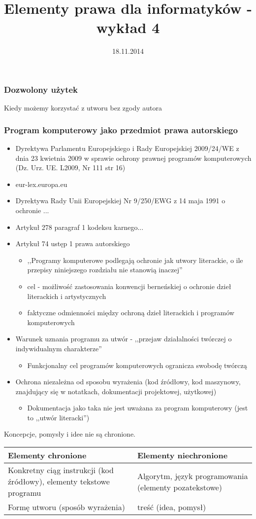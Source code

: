 \documentclass[12pt,a4paper]{article}
\title{Elementy prawa dla informatyków - wykład 4}
\author{}
\date{18.11.2014}
\begin{document}
\maketitle
\subsubsection{Dozwolony użytek}
Kiedy możemy  korzystać z utworu bez zgody autora
\subsubsection{Program komputerowy jako przedmiot prawa autorskiego}
\begin{itemize}
\item Dyrektywa Parlamentu Europejskiego i Rady Europejskiej 2009/24/WE z dnia 23 kwietnia 2009 w sprawie ochrony prawnej programów komputerowych (Dz. Urz. UE. L2009, Nr 111 str 16) 
\item eur-lex.europa.eu
\item Dyrektywa Rady Unii Europejskiej Nr 9/250/EWG z 14 maja 1991 o ochronie ...
\item Artykuł 278 paragraf 1 kodeksu karnego...
\item Artykuł 74 ustęp 1 prawa autorskiego
\begin{itemize}
	\item ,,Programy komputerowe podlegają ochronie jak utwory literackie, o ile przepisy niniejszego rozdziału nie stanowią inaczej''
	\item cel - możliwość zastosowania konwencji berneńskiej o ochronie dzieł literackich i artystycznych
	\item faktyczne odmienności między ochroną dzieł literackich i programów komputerowych
\end{itemize}
\item Warunek uznania programu za utwór - ,,przejaw działalności twórczej o indywidualnym charakterze''
	\begin{itemize}
		\item Funkcjonalny cel programów komputerowych ogranicza swobodę twórczą
	\end{itemize}
\item Ochrona niezależna od sposobu wyrażenia (kod źródłowy, kod maszynowy, znajdujący się w notatkach, dokumentacji projektowej, użytkowej)
	\begin{itemize}
		\item Dokumentacja jako taka nie jest uważana za program komputerowy (jest to ,,utwór literacki'')
	\end{itemize}
\end{itemize}
Koncepcje, pomysły i idee nie są chronione.
\begin{center}
\begin{tabularx}{\textwidth}{|X|X|}
\hline
\textbf{Elementy chronione} & \textbf{Elementy niechronione}\\
\hline
Konkretny ciąg instrukcji (kod źródłowy), elementy tekstowe programu & Algorytm, język programowania (elementy pozatekstowe) \\
\hline
Formę utworu (sposób wyrażenia) & treść (idea, pomysł)\\
\hline
\end{tabularx}
\end{center}
\end{document}
